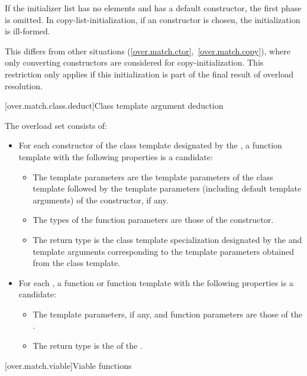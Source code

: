 If the initializer list has no elements and  has a default constructor,
the first phase is omitted.
In copy-list-initialization, if an  constructor is
chosen, the initialization is ill-formed. \begin{note}
This differs from other situations (\ref{over.match.ctor},~\ref{over.match.copy}),
where only converting constructors are considered for copy-initialization.
This restriction only
applies if this initialization is part of the final result of overload
resolution. \end{note}

[over.match.class.deduct]{Class template argument deduction}%
%

\pnum
The overload set consists of:
\begin{itemize}
\item
For each constructor
of the class template
designated by the ,
a function template with the following properties is a candidate:
\begin{itemize}
\item
The template parameters are the template parameters of the class template
followed
by the template parameters (including default template arguments) of the constructor,
if any.
\item
The types of the function parameters are those of the constructor.
\item
The return type is the class template specialization
designated by the 
and template arguments
corresponding to the template parameters
obtained from the class template.
\end{itemize}

\item
For each ,
a function or function template
with the following properties
is a candidate:
\begin{itemize}
\item
The template parameters, if any,
and function parameters
are those of the .
\item
The return type
is the 
of the .
\end{itemize}
\end{itemize}

[over.match.viable]{Viable functions}%

